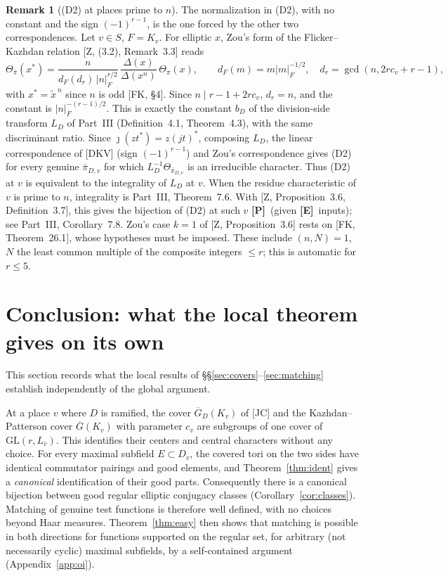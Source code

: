 \documentclass[12pt]{article}
\newcommand{\ov}[1]{\overline{#1}}
\newcommand{\GL}{\mathrm{GL}}
\newcommand{\Gb}{\ov{G}}
\newcommand{\GDb}{\ov{G}_D}
\newcommand{\pib}{\ov{\pi}}
\newcommand{\jj}{\jmath}
\newcommand{\Pv}{\textbf{[P]}}
\newcommand{\Ev}{\textbf{[E]}}
\theoremstyle{plain}
\theoremstyle{definition}
\newtheorem{remark}[theorem]{Remark}
\begin{document}
\begin{remark}[(D2) at places prime to $n$]\label{rem:D2tame}
The normalization in (D2), with no constant and the sign $(-1)^{r-1}$, is the one forced by the other two correspondences. Let $v\in S$, $F=K_v$. For elliptic $x$, Zou's form of the Flicker--Kazhdan relation [Z, (3.2), Remark~3.3] reads
\[
\Theta_{\pib}(x^*)=\frac{n}{d_F(d_r)\,|n|_F^{r/2}}\,\frac{\Delta(x)}{\Delta(x^n)}\,\Theta_\pi(x),\qquad d_F(m)=m|m|_F^{-1/2},\quad d_r=\gcd(n,2rc_v+r-1),
\]
with $x^*=\tilde x^{\,n}$ since $n$ is odd [FK, \S4]. Since $n\mid r-1+2rc_v$, $d_r=n$, and the constant is $|n|_F^{-(r-1)/2}$. This is exactly the constant $b_D$ of the division-side transform $L_D$ of Part~III (Definition~4.1, Theorem~4.3), with the same discriminant ratio. Since $\jj(zt^*)=z(jt)^*$, composing $L_D$, the linear correspondence of [DKV] (sign $(-1)^{r-1}$) and Zou's correspondence gives (D2) for every genuine $\pib_{D,v}$ for which $L_D^{-1}\Theta_{\pib_{D,v}}$ is an irreducible character. Thus (D2) at $v$ is equivalent to the integrality of $L_D$ at $v$. When the residue characteristic of $v$ is prime to $n$, integrality is Part~III, Theorem~7.6. With [Z, Proposition~3.6, Definition~3.7], this gives the bijection of (D2) at such $v$ \Pv\ (given \Ev\ inputs); see Part~III, Corollary~7.8. Zou's case $k=1$ of [Z, Proposition~3.6] rests on [FK, Theorem~26.1], whose hypotheses must be imposed. These include $(n,N)=1$, $N$ the least common multiple of the composite integers $\le r$; this is automatic for $r\le5$.
\end{remark}

\section{Conclusion: what the local theorem gives on its own}\label{sec:conclusion}
This section records what the local results of \S\S\ref{sec:covers}--\ref{sec:matching} establish independently of the global argument.

At a place $v$ where $D$ is ramified, the cover $\GDb(K_v)$ of [JC] and the Kazhdan--Patterson cover $\Gb(K_v)$ with parameter $c_v$ are subgroups of one cover of $\GL(r,L_v)$. This identifies their centers and central characters without any choice. For every maximal subfield $E\subset D_v$, the covered tori on the two sides have identical commutator pairings and good elements, and Theorem~\ref{thm:ident} gives a \emph{canonical} identification of their good parts. Consequently there is a canonical bijection between good regular elliptic conjugacy classes (Corollary~\ref{cor:classes}). Matching of genuine test functions is therefore well defined, with no choices beyond Haar measures. Theorem~\ref{thm:easy} then shows that matching is possible in both directions for functions supported on the regular set, for arbitrary (not necessarily cyclic) maximal subfields, by a self-contained argument (Appendix~\ref{app:oi}).
\end{document}
